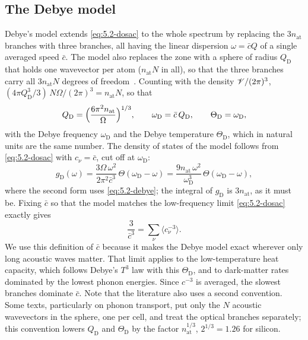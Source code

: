 \subsection{The Debye model}

Debye's model extends \cref{eq:5.2-dosac} to the whole spectrum by replacing the $3n_{\mathrm{at}}$ branches with three branches, all having the linear dispersion $\omega = \bar cQ$ of a single averaged speed $\bar c$. The model also replaces the zone with a sphere of radius $Q_{\mathrm{D}}$ that holds one wavevector per atom ($n_{\mathrm{at}}N$ in all), so that the three branches carry all $3n_{\mathrm{at}}N$ degrees of freedom~\cite[Chap.~23]{ashcroft1976solid}. Counting with the density $\mathscr{V}/(2\pi)^3$, $(4\pi Q_{\mathrm{D}}^3/3)\,N\Omega/(2\pi)^3 = n_{\mathrm{at}}N$, so that
\begin{equation}
  Q_{\mathrm{D}} = \Bigl(\frac{6\pi^2n_{\mathrm{at}}}{\Omega}\Bigr)^{1/3} , \qquad
  \omega_{\mathrm{D}} = \bar c\,Q_{\mathrm{D}} , \qquad
  \Theta_{\mathrm{D}} = \omega_{\mathrm{D}} ,
  \label{eq:5.2-debye}
\end{equation}
with the Debye frequency $\omega_{\mathrm{D}}$ and the Debye temperature $\Theta_{\mathrm{D}}$, which in natural units are the same number. The density of states of the model follows from \cref{eq:5.2-dosac} with $c_\nu = \bar c$, cut off at $\omega_{\mathrm{D}}$:
\begin{equation}
  g_{\mathrm{D}}(\omega) = \frac{3\Omega\,\omega^2}{2\pi^2\bar c^3}\,\Theta(\omega_{\mathrm{D}} - \omega) = \frac{9n_{\mathrm{at}}\,\omega^2}{\omega_{\mathrm{D}}^3}\,\Theta(\omega_{\mathrm{D}} - \omega) ,
  \label{eq:5.2-gD}
\end{equation}
where the second form uses \cref{eq:5.2-debye}; the integral of $g_{\mathrm{D}}$ is $3n_{\mathrm{at}}$, as it must be. Fixing $\bar c$ so that the model matches the low-frequency limit \cref{eq:5.2-dosac} exactly gives
\begin{equation}
  \frac{3}{\bar c^3} = \sum_\nu\bigl\langle c_\nu^{-3}\bigr\rangle .
  \label{eq:5.2-cbar}
\end{equation}
We use this definition of $\bar c$ because it makes the Debye model exact wherever only long acoustic waves matter. That limit applies to the low-temperature heat capacity, which follows Debye's $T^3$ law with this $\Theta_{\mathrm{D}}$, and to dark-matter rates dominated by the lowest phonon energies. Since $c^{-3}$ is averaged, the slowest branches dominate $\bar c$. Note that the literature also uses a second convention. Some texts, particularly on phonon transport, put only the $N$ acoustic wavevectors in the sphere, one per cell, and treat the optical branches separately; this convention lowers $Q_{\mathrm{D}}$ and $\Theta_{\mathrm{D}}$ by the factor $n_{\mathrm{at}}^{1/3}$, $2^{1/3} = 1.26$ for silicon.

